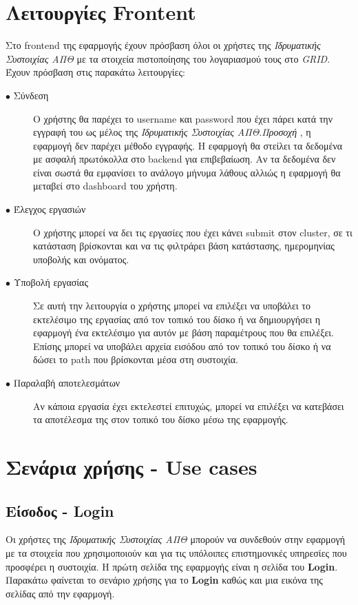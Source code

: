 \vspace{60mm}

\section{Λειτουργίες Frontent}

Στο frontend της εφαρμογής έχουν πρόσβαση όλοι οι χρήστες της  \textit{Ιδρυματικής Συστοιχίας ΑΠΘ} με τα στοιχεία πιστοποίησης του λογαριασμού τους στο \textit{GRID}. Έχουν πρόσβαση στις παρακάτω λειτουργίες:

\begin{description}
  \item[$\bullet$ Σύνδεση] O χρήστης θα παρέχει το username και password που έχει πάρει κατά την εγγραφή του ως μέλος της \textit{Ιδρυματικής Συστοιχίας ΑΠΘ}.\textit{Προσοχή} , η εφαρμογή δεν παρέχει μέθοδο εγγραφής. Η εφαρμογή θα στείλει τα δεδομένα με ασφαλή πρωτόκολλα στο backend για επιβεβαίωση. Αν τα δεδομένα δεν είναι σωστά θα εμφανίσει το ανάλογο μήνυμα λάθους αλλιώς η εφαρμογή θα μεταβεί στο dashboard του χρήστη.
  \item[$\bullet$ Έλεγχος εργασιών] Ο χρήστης μπορεί να δει τις εργασίες που έχει κάνει submit στον cluster, σε τι κατάσταση βρίσκονται και να τις φιλτράρει βάση κατάστασης, ημερομηνίας υποβολής και ονόματος.
    \item[$\bullet$ Υποβολή εργασίας] Σε αυτή την λειτουργία ο χρήστης μπορεί να επιλέξει να υποβάλει το εκτελέσιμο της εργασίας από τον τοπικό του δίσκο ή να δημιουργήσει η εφαρμογή ένα εκτελέσιμο για αυτόν με βάση παραμέτρους που θα επιλέξει. Επίσης μπορεί να υποβάλει αρχεία εισόδου από τον τοπικό του δίσκο ή να δώσει το path που βρίσκονται μέσα στη συστοιχία.
    \item[$\bullet$ Παραλαβή αποτελεσμάτων] Αν κάποια εργασία έχει εκτελεστεί επιτυχώς, μπορεί να επιλέξει να κατεβάσει τα αποτέλεσμα της στον τοπικό του δίσκο μέσω της εφαρμογής.
\end{description}

\section{Σενάρια χρήσης - Use cases}

\subsection{Είσοδος - Login}

Οι χρήστες της \textit{Ιδρυματικής Συστοιχίας ΑΠΘ} μπορούν να συνδεθούν στην εφαρμογή με τα στοιχεία που χρησιμοποιούν και για τις υπόλοιπες επιστημονικές υπηρεσίες που προσφέρει η συστοιχία. Η πρώτη σελίδα της εφαρμογής είναι η σελίδα του \textbf{Login}. Παρακάτω φαίνεται το σενάριο χρήσης για το \textbf{Login} καθώς και μια εικόνα της σελίδας από την εφαρμογή.


